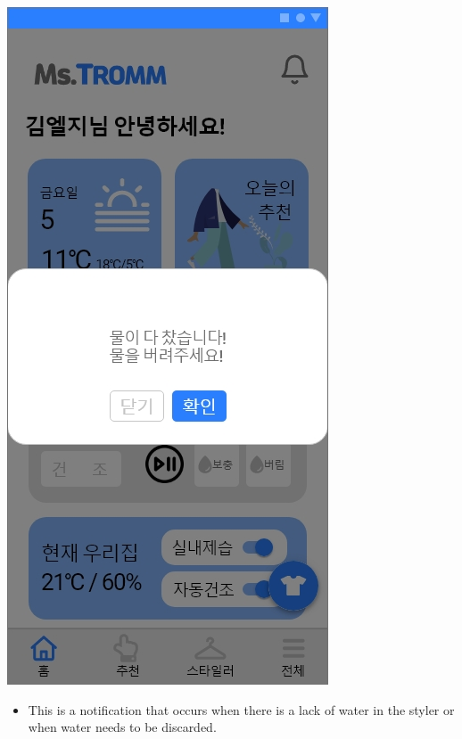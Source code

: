 \documentclass[conference]{IEEEtran}
\begin{document}
\begin{enumerate}
{            \includegraphics[scale=0.18]{제어추천 팝업2.jpg}}
\break
    \begin{itemize}
    \item[] This is a notification that occurs when there is a lack of water in the styler or when water needs to be discarded. \\ \\
\end{itemize}

\end{enumerate}
\end{document}
